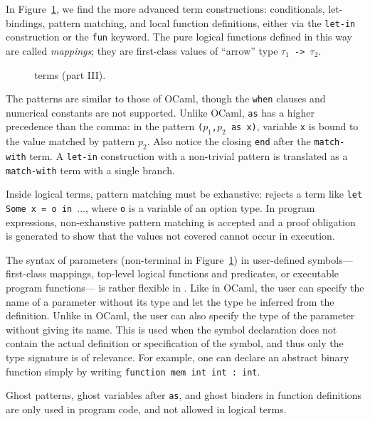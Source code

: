 In Figure~\ref{fig:bnf:term3}, we find the more advanced
term constructions: conditionals, let-bindings, pattern
matching, and local function definitions,
either via the \texttt{let-in} construction or the
\texttt{fun} keyword. The pure logical functions
defined in this way are called \emph{mappings};
they are first-class values of ``arrow'' type
\texttt{$\tau_1$ -> $\tau_2$}.

\begin{figure}[ht]
\begin{center}\end{center}
\caption{\whyml terms (part III).}
\label{fig:bnf:term3}
\end{figure}

The patterns are similar to those of OCaml, though the \texttt{when}
clauses and numerical constants are not supported. Unlike OCaml,
\texttt{as} has a higher precedence than the comma: in the pattern
\texttt{($p_1$,$p_2$ as x)}, variable \texttt{x} is bound to
the value matched by pattern $p_2$. Also notice the closing
\texttt{end} after the \texttt{match-with} term.
A \texttt{let-in} construction with a non-trivial pattern is
translated as a \texttt{match-with} term with a single branch.

Inside logical terms, pattern matching must be exhaustive:
\whyml rejects a term like \texttt{let Some x = o in $\dots$},
where \texttt{o} is a variable of an option type.
In program expressions, non-exhaustive pattern matching
is accepted and a proof obligation is generated to show
that the values not covered cannot occur in execution.

The syntax of parameters (non-terminal
 in Figure~\ref{fig:bnf:term3})
in user-defined symbols---%
first-class mappings,
top-level logical functions and predicates,
or executable program functions---%
is rather flexible in \whyml.
Like in OCaml, the user can specify the name of a parameter
without its type and let the type be inferred from the
definition. Unlike in OCaml, the user can also specify
the type of the parameter without giving its name.
This is used when the symbol declaration does not
contain the actual definition or specification of
the symbol, and thus only the type signature is of
relevance.
For example, one can declare an abstract binary function
simply by writing
\texttt{function mem int int : int}.



Ghost patterns, ghost variables after \texttt{as},
and ghost binders in function definitions are only used
in program code, and not allowed in logical terms.

